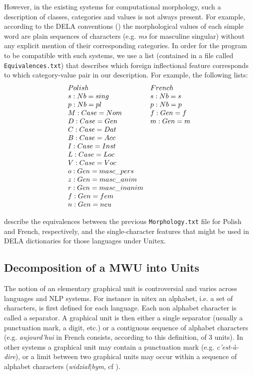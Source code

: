 \bigskip
\noindent However, in the existing systems for computational morphology, such a
description of classes, categories and values is not always present. For example, according to the DELA 
conventions (\cite{dicos-francais}) the morphological values of each simple word are plain 
sequences of characters (e.g. \emph{ms} for masculine singular) without any explicit mention 
of their corresponding categories. In order for the program to be compatible
with such systems, we use a list (contained in a file
called
\verb+Equivalences.txt+) that describes which foreign inflectional feature
corresponds to which category-value pair in our description. For example, the following lists:
\[
\begin{array}[c]{ll}
Polish                        &French\\
s: Nb=sing                    &s: Nb=s  \\
p: Nb=pl                      &p: Nb=p \\
M: Case=Nom                   &f: Gen=f  \\
D: Case=Gen                   &m: Gen=m    \\
C: Case=Dat  &\\
B: Case=Acc  &\\
I: Case=Inst  &\\
L: Case=Loc  &\\
V: Case=Voc  &\\
o: Gen=masc\_pers  &\\
z: Gen=masc\_anim  &\\
r: Gen=masc\_inanim  &\\
f: Gen=fem  &\\
n: Gen=neu &
\end{array}
\]

\bigskip
\noindent describe the equivalences between the previous \verb+Morphology.txt+
file for Polish and French, respectively, and the single-character features that might be used in 
DELA dictionaries for those languages under Unitex.

\subsection{Decomposition of a MWU into Units}
\label{subsec:decomp}
The notion of an elementary graphical unit is controversial and varies across languages 
and NLP systems. For instance in nitex an alphabet, i.e. a set of characters, is
first defined for each language. Each non alphabet character is called a separator. A graphical 
unit is then either a single separator (usually a punctuation mark, a digit, etc.) or a 
contiguous sequence of alphabet characters (e.g. \emph{aujourd'hui} in French consists, 
according to this definition, of 3 units). In other systems a graphical unit may contain 
a punctuation mark (e.g. \emph{c'est-\`a-dire}), or a limit between two graphical units 
may occur within a sequence of alphabet characters (\emph{widzia\l $\mid$bym}, cf \cite{PrzepWol03}). 

